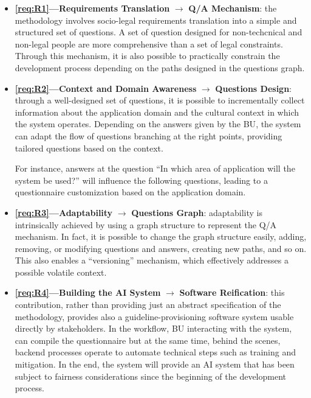 \documentclass[12pt,a4paper,openright,twoside]{book}
\begin{document}
\begin{itemize}[label={}]

    \item \textbf{\ref{req:R1}---Requirements Translation} $\rightarrow$ \textbf{\ac{Q/A} Mechanism}:
    the methodology involves socio-legal requirements translation into a simple and structured set of questions. 
    A set of question designed for non-techcnical and non-legal people are more comprehensive than a set of legal constraints.
    Through this mechanism, it is also possible to practically constrain the development process depending on the paths designed in the questions graph.

    \item \textbf{\ref{req:R2}---Context and Domain Awareness} $\rightarrow$ \textbf{Questions Design}:
    through a well-designed set of questions, it is possible to incrementally collect information about the application domain and the cultural context in which the system operates.
    Depending on the answers given by the \ac{BU}, the system can adapt the flow of questions branching at the right points, providing tailored questions based on the context.
    
    For instance, answers at the question ``In which area of application will the system be used?'' will influence the following questions, leading to a questionnaire customization based on the application domain.

    \item \textbf{\ref{req:R3}---Adaptability} $\rightarrow$ \textbf{Questions Graph}:
    adaptability is intrinsically achieved by using a graph structure to represent the \ac{Q/A} mechanism.
    In fact, it is possible to change the graph structure easily, adding, removing, or modifying questions and answers, creating new paths, and so on.
    This also enables a ``versioning'' mechanism, which effectively addresses a possible volatile context.
    
    \item \textbf{\ref{req:R4}---Building the AI System} $\rightarrow$ \textbf{Software Reification}:
    this contribution, rather than providing just an abstract specification of the methodology, provides also a guideline-provisioning software system usable directly by stakeholders.
    In the workflow, \ac{BU} interacting with the system, can compile the questionnaire but at the same time, behind the scenes, backend processes operate to automate technical steps such as training and mitigation.
    In the end, the system will provide an \ac{AI} system that has been subject to fairness considerations since the beginning of the development process.
\end{itemize}
\end{document}
